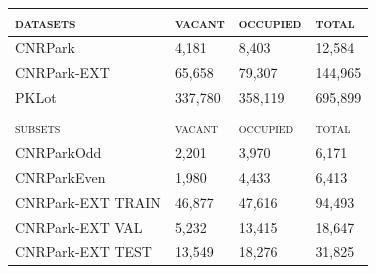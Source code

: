 \begin{table}
\begin{tabularx}{\linewidth}{lRRR}
\toprule
\textsc{datasets}    & \textsc{vacant} & \textsc{occupied} & \textsc{total} \\
\midrule

     CNRPark           & 4,181          & 8,403          & 12,584          \\
     CNRPark-EXT       & 65,658         & 79,307         & 144,965         \\
     PKLot             & 337,780        & 358,119        & 695,899         \\ %
\bottomrule
                       &               &               &                \\
\toprule
\textsc{subsets} & \textsc{vacant} & \textsc{occupied} & \textsc{total} \\ \midrule
    CNRParkOdd        & 2,201          & 3,970          & 6,171           \\
    CNRParkEven       & 1,980          & 4,433          & 6,413           \\ %
\midrule
     CNRPark-EXT TRAIN     & 46,877         & 47,616         & 94,493          \\
     CNRPark-EXT VAL       & 5,232          & 13,415         & 18,647          \\
     CNRPark-EXT TEST      & 13,549         & 18,276         & 31,825          \\ %

\end{tabularx}
\end{table}
